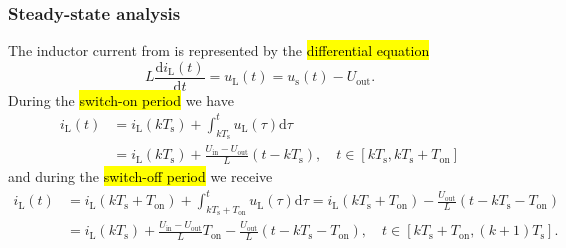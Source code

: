 \begin{frame}
    \frametitle{Steady-state analysis}
    The inductor current from  is represented by the \hl{differential equation}
    \begin{equation}
        L \frac{\mathrm{d}i_\mathrm{L}(t)}{\mathrm{d}t} =  u_\mathrm{L}(t) =  u_\mathrm{s}(t) - U_\mathrm{out}.
    \end{equation}
    During the \hl{switch-on period} we have
    \begin{equation}
        \begin{split}
            i_\mathrm{L}(t) &= i_\mathrm{L}(k T_\mathrm{s}) + \int_{k T_\mathrm{s}}^{t}u_\mathrm{L}(\tau)\mathrm{d}\tau \\
                            &= i_\mathrm{L}(k T_\mathrm{s}) + \frac{U_\mathrm{in}-U_\mathrm{out}}{L} (t - k T_\mathrm{s})
            , \quad t\in [k T_\mathrm{s}, k T_\mathrm{s} + T_\mathrm{on}]
        \end{split}
        \label{eq:inductor-current-switch-on-simple-step-down}
    \end{equation}
    and during the \hl{switch-off period} we receive
    \begin{equation}
        \begin{split}
            i_\mathrm{L}(t) &= i_\mathrm{L}(k T_\mathrm{s} + T_\mathrm{on}) + \int_{k T_\mathrm{s}+T_\mathrm{on}}^{t}u_\mathrm{L}(\tau)\mathrm{d}\tau= i_\mathrm{L}(k T_\mathrm{s} + T_\mathrm{on}) - \frac{U_\mathrm{out}}{L} (t - k T_\mathrm{s} - T_\mathrm{on})\\
            \               &= i_\mathrm{L}(k T_\mathrm{s}) + \frac{U_\mathrm{in}-U_\mathrm{out}}{L} T_\mathrm{on} - \frac{U_\mathrm{out}}{L} (t - k T_\mathrm{s} - T_\mathrm{on}), \quad 
            t\in [k T_\mathrm{s} + T_\mathrm{on}, (k+1) T_\mathrm{s}]. 
        \end{split} 
        \label{eq:inductor-current-switch-off}
    \end{equation}
\end{frame}

